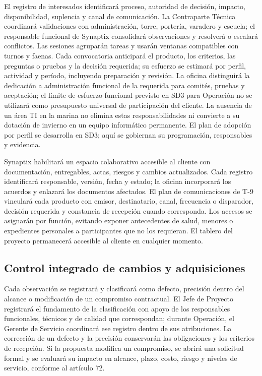 El registro de interesados identificará proceso, autoridad de decisión, impacto, disponibilidad, suplencia y canal de comunicación. La Contraparte Técnica coordinará validaciones con administración, torre, portería, varadero y escuela; el responsable funcional de Synaptix consolidará observaciones y resolverá o escalará conflictos. Las sesiones agruparán tareas y usarán ventanas compatibles con turnos y faenas. Cada convocatoria anticipará el producto, los criterios, las preguntas o pruebas y la decisión requerida; su esfuerzo se estimará por perfil, actividad y período, incluyendo preparación y revisión. La oficina distinguirá la dedicación a administración funcional de la requerida para comités, pruebas y aceptación; el límite de esfuerzo funcional previsto en SD3 para Operación no se utilizará como presupuesto universal de participación del cliente. La ausencia de un área TI en la marina no elimina estas responsabilidades ni convierte a su dotación de invierno en un equipo informático permanente. El plan de adopción por perfil se desarrolla en SD3; aquí se gobiernan su programación, responsables y evidencia. \parencites[numerales 13.1--13.3, pp.~28--30]{sd6-c07}[secs.~3.1.2.3 y 3.4.4, pp.~10--11 y 31--32]{sd6-sd3}

Synaptix habilitará un espacio colaborativo accesible al cliente con documentación, entregables, actas, riesgos y cambios actualizados. Cada registro identificará responsable, versión, fecha y estado; la oficina incorporará los acuerdos y enlazará los documentos afectados. El plan de comunicaciones de T-9 vinculará cada producto con emisor, destinatario, canal, frecuencia o disparador, decisión requerida y constancia de recepción cuando corresponda. Los accesos se asignarán por función, evitando exponer antecedentes de salud, menores o expedientes personales a participantes que no los requieran. El tablero del proyecto permanecerá accesible al cliente en cualquier momento. \parencite[RT-19.05/08, pp.~33--34]{sd6-bt}

\subsection{Control integrado de cambios y adquisiciones}
Cada observación se registrará y clasificará como defecto, precisión dentro del alcance o modificación de un compromiso contractual. El Jefe de Proyecto registrará el fundamento de la clasificación con apoyo de los responsables funcionales, técnicos y de calidad que correspondan; durante Operación, el Gerente de Servicio coordinará ese registro dentro de sus atribuciones. La corrección de un defecto y la precisión conservarán las obligaciones y los criterios de recepción. Si la propuesta modifica un compromiso, se abrirá una solicitud formal y se evaluará su impacto en alcance, plazo, costo, riesgo y niveles de servicio, conforme al artículo 72.

